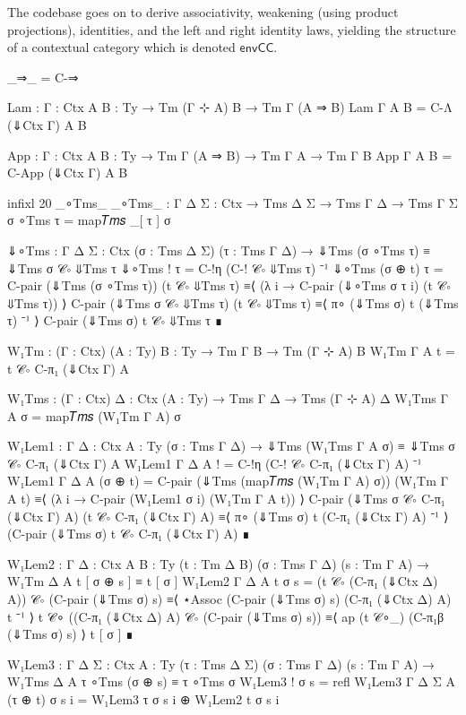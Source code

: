 The codebase goes on to derive associativity, weakening (using product
projections), identities, and the left and right identity laws, yielding the
structure of a contextual category which is denoted $\mathsf{envCC}$.

\begin{code}[hide]
  _⇒_ = C-⇒

  Lam : {Γ : Ctx} {A B : Ty} → Tm (Γ ⊹ A) B → Tm Γ (A ⇒ B)
  Lam {Γ} {A} {B} = C-Λ (⇓Ctx Γ) A B

  App : {Γ : Ctx} {A B : Ty} → Tm Γ (A ⇒ B) → Tm Γ A → Tm Γ B
  App {Γ} {A} {B} = C-App (⇓Ctx Γ) A B

  infixl 20 _∘Tms_
  _∘Tms_ : {Γ Δ Σ : Ctx} → Tms Δ Σ → Tms Γ Δ → Tms Γ Σ
  σ ∘Tms τ = map𝑇𝑚𝑠 _[ τ ] σ

  ⇓∘Tms : {Γ Δ Σ : Ctx} (σ : Tms Δ Σ) (τ : Tms Γ Δ) →
    ⇓Tms (σ ∘Tms τ) ≡ ⇓Tms σ 𝒞∘ ⇓Tms τ
  ⇓∘Tms ! τ = C-!η (C-! 𝒞∘ ⇓Tms τ) ⁻¹
  ⇓∘Tms (σ ⊕ t) τ =
    C-pair (⇓Tms (σ ∘Tms τ)) (t 𝒞∘ ⇓Tms τ)
      ≡⟨ (λ i → C-pair (⇓∘Tms σ τ i) (t 𝒞∘ ⇓Tms τ)) ⟩
    C-pair (⇓Tms σ 𝒞∘ ⇓Tms τ) (t 𝒞∘ ⇓Tms τ)
      ≡⟨ π∘ (⇓Tms σ) t (⇓Tms τ) ⁻¹ ⟩
    C-pair (⇓Tms σ) t 𝒞∘ ⇓Tms τ
      ∎

  W₁Tm : (Γ : Ctx) (A : Ty) {B : Ty} → Tm Γ B → Tm (Γ ⊹ A) B
  W₁Tm Γ A t = t 𝒞∘ C-π₁ (⇓Ctx Γ) A

  W₁Tms : (Γ : Ctx) {Δ : Ctx} (A : Ty) → Tms Γ Δ → Tms (Γ ⊹ A) Δ
  W₁Tms Γ A σ = map𝑇𝑚𝑠 (W₁Tm Γ A) σ

  W₁Lem1 : {Γ Δ : Ctx} {A : Ty} (σ : Tms Γ Δ) →
    ⇓Tms (W₁Tms Γ A σ) ≡ ⇓Tms σ 𝒞∘ C-π₁ (⇓Ctx Γ) A
  W₁Lem1 {Γ} {Δ} {A} ! = C-!η (C-! 𝒞∘ C-π₁ (⇓Ctx Γ) A) ⁻¹
  W₁Lem1 {Γ} {Δ} {A} (σ ⊕ t) =
    C-pair (⇓Tms (map𝑇𝑚𝑠 (W₁Tm Γ A) σ)) (W₁Tm Γ A t)
      ≡⟨ (λ i → C-pair (W₁Lem1 σ i) (W₁Tm Γ A t)) ⟩
    C-pair (⇓Tms σ 𝒞∘ C-π₁ (⇓Ctx Γ) A) (t 𝒞∘ C-π₁ (⇓Ctx Γ) A)
      ≡⟨ π∘ (⇓Tms σ) t (C-π₁ (⇓Ctx Γ) A) ⁻¹ ⟩
    (C-pair (⇓Tms σ) t 𝒞∘ C-π₁ (⇓Ctx Γ) A)
      ∎

  W₁Lem2 : {Γ Δ : Ctx} {A B : Ty} (t : Tm Δ B) (σ : Tms Γ Δ) (s : Tm Γ A) →
    W₁Tm Δ A t [ σ ⊕ s ] ≡ t [ σ ]
  W₁Lem2 {Γ} {Δ} {A} t σ s =
    (t 𝒞∘ (C-π₁ (⇓Ctx Δ) A)) 𝒞∘ (C-pair (⇓Tms σ) s)
      ≡⟨ ⋆Assoc (C-pair (⇓Tms σ) s) (C-π₁ (⇓Ctx Δ) A) t ⁻¹ ⟩
    t 𝒞∘ ((C-π₁ (⇓Ctx Δ) A) 𝒞∘ (C-pair (⇓Tms σ) s))
      ≡⟨ ap (t 𝒞∘_) (C-π₁β (⇓Tms σ) s) ⟩
    t [ σ ]
      ∎

  W₁Lem3 : {Γ Δ Σ : Ctx} {A : Ty} (τ : Tms Δ Σ) (σ : Tms Γ Δ) (s : Tm Γ A) →
    W₁Tms Δ A τ ∘Tms (σ ⊕ s) ≡ τ ∘Tms σ
  W₁Lem3 ! σ s = refl
  W₁Lem3 {Γ} {Δ} {Σ} {A} (τ ⊕ t) σ s i = W₁Lem3 τ σ s i ⊕ W₁Lem2 t σ s i


\end{code}
